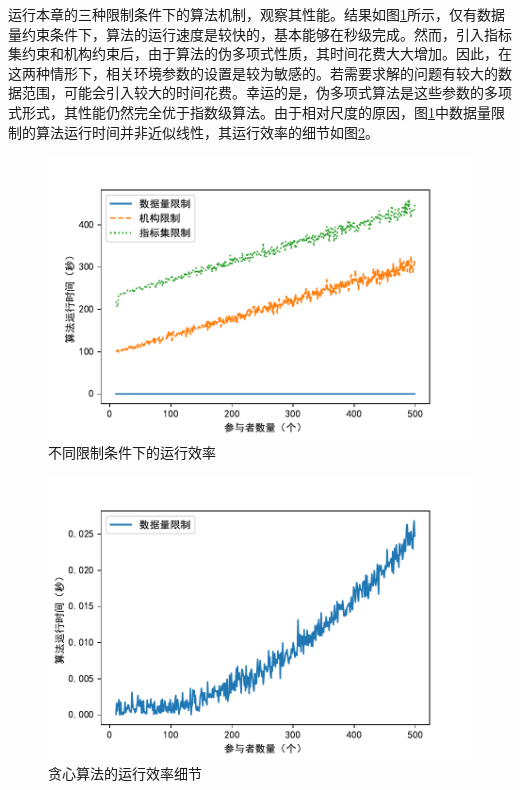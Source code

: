 \documentclass[promaster]{thesis-uestc}
\begin{document}
运行本章的三种限制条件下的算法机制，观察其性能。结果如图\ref{times}所示，仅有数据量约束条件下，算法的运行速度是较快的，基本能够在秒级完成。然而，引入指标集约束和机构约束后，由于算法的伪多项式性质，其时间花费大大增加。因此，在这两种情形下，相关环境参数的设置是较为敏感的。若需要求解的问题有较大的数据范围，可能会引入较大的时间花费。幸运的是，伪多项式算法是这些参数的多项式形式，其性能仍然完全优于指数级算法。由于相对尺度的原因，图\ref{times}中数据量限制的算法运行时间并非近似线性，其运行效率的细节如图\ref{greedytimes}。

\begin{figure}[H]
    \includegraphics[width=350pt]{exp/threetimes.pdf}
    \caption{不同限制条件下的运行效率}
    \label{times}
\end{figure}


\begin{figure}[H]
    \includegraphics[width=350pt]{exp/greedytimes.pdf}
    \caption{贪心算法的运行效率细节}
    \label{greedytimes}
\end{figure}
\end{document}
